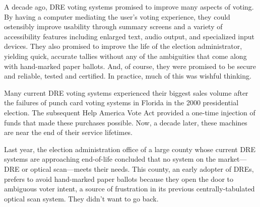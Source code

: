 \label{sec:intro}

A decade ago, DRE voting systems promised to improve many aspects of voting. 
By having a
computer mediating the user's voting experience, they could ostensibly
improve usability through summary screens and a
variety of accessibility features including enlarged text, audio
output, and specialized input devices. They also promised to improve
the life of the election administrator, yielding quick, accurate tallies without
any of the ambiguities that come along with hand-marked paper ballots.
And, of course, they were promised to be secure and reliable, tested
and certified. In practice, much of this was wishful thinking.

Many current DRE voting systems experienced their biggest sales
volume after the failures of punch card voting
systems in Florida in the 2000 presidential election. 
The subsequent Help America Vote Act
provided a one-time injection of funds that made these purchases
possible. Now, a decade later, these machines are near the end of
their service lifetimes. 

Last year, the election administration office of a large county
whose current DRE systems are approaching end-of-life
concluded that no system on the 
market---DRE or optical scan---meets their needs. 
This county, an early adopter of DREs, prefers to avoid 
hand-marked paper ballots because they
open the door to ambiguous voter intent, a source of
frustration in its previous centrally-tabulated optical scan
system. 
They didn't want to go back.

